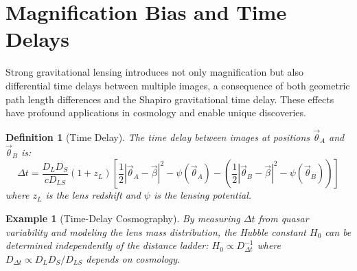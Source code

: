 \documentclass[11pt,a4paper]{article}
\newtheorem{definition}{Definition}[section]
\newtheorem{example}{Example}[section]
\begin{document}
\section{Magnification Bias and Time Delays}

Strong gravitational lensing introduces not only magnification but also differential time delays
between multiple images, a consequence of both geometric path length differences and the Shapiro
gravitational time delay. These effects have profound applications in cosmology and enable unique
discoveries.

\begin{definition}[Time Delay]
The time delay between images at positions $\vec{\theta}_A$ and $\vec{\theta}_B$ is:
\begin{equation}
\Delta t = \frac{D_L D_S}{c D_{LS}} (1 + z_L) \left[\frac{1}{2}|\vec{\theta}_A - \vec{\beta}|^2 -
\psi(\vec{\theta}_A) - \left(\frac{1}{2}|\vec{\theta}_B - \vec{\beta}|^2 - \psi(\vec{\theta}_B)\right)\right]
\end{equation}
where $z_L$ is the lens redshift and $\psi$ is the lensing potential.
\end{definition}

\begin{example}[Time-Delay Cosmography]
By measuring $\Delta t$ from quasar variability and modeling the lens mass distribution, the Hubble
constant $H_0$ can be determined independently of the distance ladder: $H_0 \propto D_{\Delta t}^{-1}$
where $D_{\Delta t} \propto D_L D_S / D_{LS}$ depends on cosmology.
\end{example}
\end{document}
